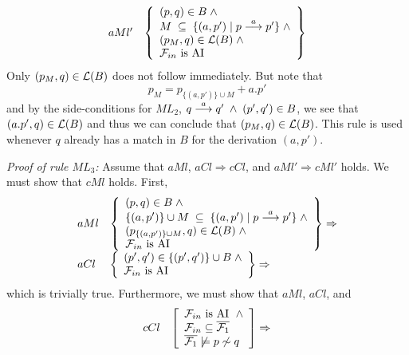 \begin{theorem}[Soundness]
\begin{trivlist}
\[\begin{array}{ll}
aMl' &
\left\{
\begin{array}{l}
(p,q)\in B\;\wedge\\
M\;\subseteq\;\{(a,p')\mid p\stackrel{a}{\longrightarrow}p'\}\;\wedge\\
(p_{M},q)\in{\cal L}(B)\;\wedge\\
{\cal F}_{in} \mbox{ is AI}
\end{array}\right\}

\end{array}
\]
Only $(p_M,q)\in{\cal L}(B)$ does not follow immediately. But note that
\[
p_M = p_{\{(a,p')\}\cup M} + a.p'
\]
and by the side-conditions for $ML_2$, $q\stackrel{a}{\longrightarrow}q'\;\wedge\;(p',q')\in B$, we see that $(a.p',q)\in{\cal L}(B)$ and thus we can conclude that $(p_M,q)\in{\cal L}(B)$. This rule is used whenever $q$ already has a match in $B$ for the derivation $(a,p')$.

\item[\it Proof of rule\/ $ML_3$:]
Assume that $aMl$, $aCl\Rightarrow cCl$, and $aMl'\Rightarrow cMl'$ holds. We must show that $cMl$ holds. First,
\[
\begin{array}{ll}
aMl &
\left\{
\begin{array}{l}
(p,q)\in B\;\wedge\\
\{(a,p')\}\cup M\;\subseteq\;\{(a,p')\mid p\stackrel{a}{\longrightarrow}p'\}\;\wedge\\
(p_{\{(a,p')\}\cup M},q)\in{\cal L}(B)\;\wedge\\
{\cal F}_{in} \mbox{ is AI}
\end{array}\right\}\Rightarrow\\

aCl &
\left\{
\begin{array}{l}
(p',q')\in \{(p',q')\}\cup B \;\wedge\\
{\cal F}_{in} \mbox{ is AI}
\end{array}
\right\}\Rightarrow\\

\end{array}
\]
which is trivially true. Furthermore, we must show that $aMl$, $aCl$, and
\[
\begin{array}{ll}
cCl &
\left[
\begin{array}{l}
{\cal F}_{in} \mbox{ is AI }\;\wedge\\
{\cal F}_{in}\subseteq \overline{{\cal F}_{1}}\\
\overline{{\cal F}_{1}}\not\models p\not\sim q
\end{array}
\right]\Rightarrow\\


\end{array}\]
\end{trivlist}
\end{theorem}
